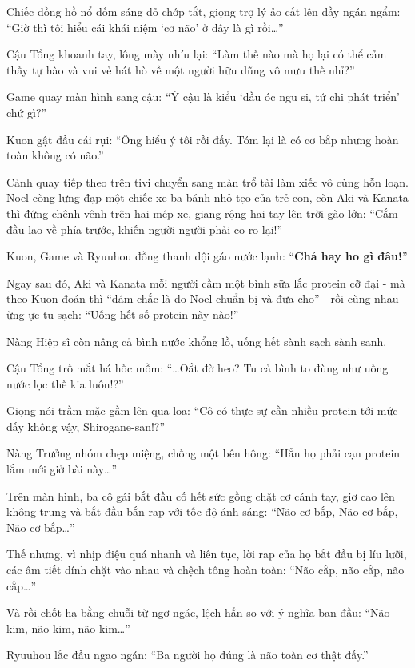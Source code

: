 \documentclass[../main.tex]{subfiles}
\begin{document}
Chiếc đồng hồ nổ đốm sáng đỏ chớp tắt, giọng trợ lý ảo cất lên đầy ngán ngẩm: ``Giờ thì tôi hiểu cái khái niệm `cơ não' ở đây là gì rồi\dots''

Cậu Tổng khoanh tay, lông mày nhíu lại: ``Làm thế nào mà họ lại có thể cảm thấy tự hào và vui vẻ hát hò về một người hữu dũng vô mưu thế nhỉ?''

Game quay màn hình sang cậu: ``Ý cậu là kiểu `đầu óc ngu si, tứ chi phát triển' chứ gì?''

Kuon gật đầu cái rụi: ``Ông hiểu ý tôi rồi đấy. Tóm lại là có cơ bắp nhưng hoàn toàn không có não.''

Cảnh quay tiếp theo trên tivi chuyển sang màn trổ tài làm xiếc vô cùng hỗn loạn. Noel còng lưng đạp một chiếc xe ba bánh nhỏ tẹo của trẻ con, còn Aki và Kanata thì đứng chênh vênh trên hai mép xe, giang rộng hai tay lên trời gào lớn: ``Cắm đầu lao về phía trước, khiến người người phải co ro lại!''


Kuon, Game và Ryuuhou đồng thanh dội gáo nước lạnh: ``\textbf{Chả hay ho gì đâu!}''

Ngay sau đó, Aki và Kanata mỗi người cầm một bình sữa lắc protein cỡ đại - mà theo Kuon đoán thì ``dám chắc là do Noel chuẩn bị và đưa cho'' - rồi cùng nhau ừng ực tu sạch: ``Uống hết số protein này nào!''

Nàng Hiệp sĩ còn nâng cả bình nước khổng lồ, uống hết sành sạch sành sanh.


Cậu Tổng trố mắt há hốc mồm: ``\dots Oắt đờ heo? Tu cả bình to đùng như uống nước lọc thế kia luôn!?''

Giọng nói trầm mặc gầm lên qua loa: ``Cô có thực sự cần nhiều protein tới mức đấy không vậy, Shirogane-san!?''

Nàng Trưởng nhóm chẹp miệng, chống một bên hông: ``Hẳn họ phải cạn protein lắm mới giở bài này\dots''

Trên màn hình, ba cô gái bắt đầu cố hết sức gồng chặt cơ cánh tay, giơ cao lên không trung và bắt đầu bắn rap với tốc độ ánh sáng: ``Não cơ bắp, Não cơ bắp, Não cơ bắp\dots''

Thế nhưng, vì nhịp điệu quá nhanh và liên tục, lời rap của họ bắt đầu bị líu lưỡi, các âm tiết dính chặt vào nhau và chệch tông hoàn toàn: ``Não cắp, não cắp, não cắp\dots''

Và rồi chốt hạ bằng chuỗi từ ngơ ngác, lệch hẳn so với ý nghĩa ban đầu: ``Não kim, não kim, não kim\dots''

Ryuuhou lắc đầu ngao ngán: ``Ba người họ đúng là não toàn cơ thật đấy.''
\end{document}
